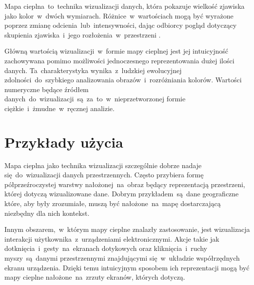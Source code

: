Mapa cieplna~to~technika wizualizacji danych, która pokazuje wielkość zjawiska jako kolor~w~dwóch wymiarach. Różnice~w~wartościach mogą być wyrażone poprzez zmianę odcienia~lub~intensywności, dając odbiorcy pogląd dotyczący skupienia zjawiska~i~jego rozłożenia~w~przestrzeni \cite{Heat_map_definition}.

Główną wartością wizualizacji~w~formie mapy cieplnej jest jej intuicyjność zachowywana pomimo możliwości jednoczesnego reprezentowania dużej ilości danych. Ta~charakterystyka wynika~z~ludzkiej ewolucyjnej zdolności~do~szybkiego analizowania obrazów~i~rozróżniania kolorów. Wartości numeryczne będące źródłem danych~do~wizualizacji~są~za~to~w~nieprzetworzonej formie ciężkie~i~żmudne~w~ręcznej analizie.

\section{Przykłady użycia}
Mapa cieplna jako technika wizualizacji szczególnie dobrze nadaje się~do~wizualizacji danych przestrzennych. Często przybiera formę półprzeźroczystej warstwy nałożonej~na~obraz będący reprezentacją przestrzeni, której dotyczą wizualizowane dane. Dobrym przykładem~są~dane geograficzne które, aby były zrozumiałe, muszą być nałożone~na~mapę dostarczającą niezbędny dla nich kontekst.

\bigskip
{}

Innym obszarem,~w~którym mapy cieplne znalazły zastosowanie, jest wizualizacja interakcji użytkownika~z~urządzeniami elektronicznymi. Akcje takie jak dotknięcia~i~gesty~na~ekranach dotykowych oraz kliknięcia~i~ruchy myszy~są~danymi przestrzennymi znajdującymi się~w~układzie współrzędnych ekranu urządzenia. Dzięki temu intuicyjnym sposobem ich reprezentacji mogą być mapy cieplne nałożone~na~zrzuty ekranów, których dotyczą.

\bigskip
{}
